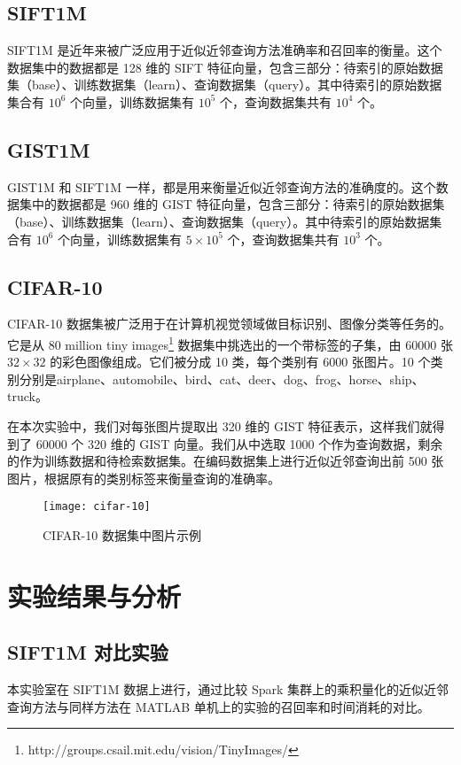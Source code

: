 \subsection{SIFT1M}
SIFT1M 是近年来被广泛应用于近似近邻查询方法准确率和召回率的衡量。这个数据集中的数据都是 128 维的 SIFT 特征向量，包含三部分：待索引的原始数据集（base）、训练数据集（learn）、查询数据集（query）。其中待索引的原始数据集合有 $10^6$ 个向量，训练数据集有 $10^5$ 个，查询数据集共有 $10^4$ 个。
\subsection{GIST1M}
GIST1M 和 SIFT1M 一样，都是用来衡量近似近邻查询方法的准确度的。这个数据集中的数据都是 960 维的 GIST 特征向量，包含三部分：待索引的原始数据集（base）、训练数据集（learn）、查询数据集（query）。其中待索引的原始数据集合有 $10^6$ 个向量，训练数据集有 $5\times10^5$ 个，查询数据集共有 $10^3$ 个。
\subsection{CIFAR-10}
CIFAR-10 数据集被广泛用于在计算机视觉领域做目标识别、图像分类等任务的。它是从 80 million tiny images\footnote{http://groups.csail.mit.edu/vision/TinyImages/} 数据集中挑选出的一个带标签的子集，由 60000 张 $32\times 32$ 的彩色图像组成。它们被分成 10 类，每个类别有 6000 张图片。10 个类别分别是airplane、automobile、bird、cat、deer、dog、frog、horse、ship、truck。

在本次实验中，我们对每张图片提取出 320 维的 GIST 特征表示，这样我们就得到了 60000 个 320 维的 GIST 向量。我们从中选取 1000 个作为查询数据，剩余的作为训练数据和待检索数据集。在编码数据集上进行近似近邻查询出前 500 张图片，根据原有的类别标签来衡量查询的准确率。

\begin{figure}[H]
  \centering
  \texttt{[image: cifar-10]}
  \caption{CIFAR-10 数据集中图片示例}
  \label{fig:cifar-10}
\end{figure}
\section{实验结果与分析}
\subsection{SIFT1M 对比实验}
本实验室在 SIFT1M 数据上进行，通过比较 Spark 集群上的乘积量化的近似近邻查询方法与同样方法在 MATLAB 单机上的实验的召回率和时间消耗的对比。

